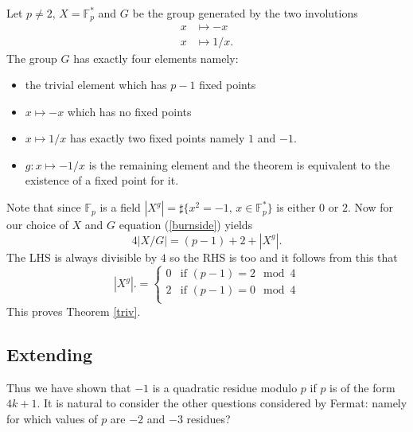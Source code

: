 \documentclass[12pt,a4paper]{amsart}
\def\fp{\mathbb{F}_p}
\begin{document}
Let $p\neq 2$,  $X = \fp^*$ and $G$ be the group generated by the two involutions
\begin{eqnarray*}
x & \mapsto -x \\
x & \mapsto 1/x.
\end{eqnarray*}
The group  $G$ has exactly four elements namely:
\begin{itemize}
\item the trivial element which has  $p-1$ fixed points
\item $x\mapsto -x$ which has no fixed points 
\item  $x\mapsto 1/x$ has exactly two fixed points namely $1$ and $-1$.
\item  $g:x \mapsto -1/x$ is the remaining element and the theorem is equivalent to the existence of a fixed point for it.
\end{itemize}
Note that since $\fp$ is a field 
$|X^g| = \sharp \{x^2 = -1, \, x\in \fp^* \}$
is either $0$ or $2$.
Now for our choice of $X$ and $G$ equation (\ref{burnside}) yields
\begin{equation}
4 |X/G|   = (p-1) + 2 + |X^g|.
\end{equation}  
The LHS is always divisible by $4$ so the  RHS is too and
it follows from this that
$$ |X^g|. = \left\{  \begin{array}{ll}
		0 & \text{if }(p-1) =  2 \mod 4 \\
2 & \text{if }(p-1) =  0 \mod 4 \\
\end{array}
\right.
$$
This proves Theorem \ref{triv}.

\subsection{Extending}\label{extending}

Thus we have shown that $-1$ is a quadratic residue modulo $p$ if
$p$ is of the form $4k+1$. 
It is natural to consider the other questions considered by Fermat:
namely for which values of $p$ are $-2$ and $-3$ residues?
\end{document}
